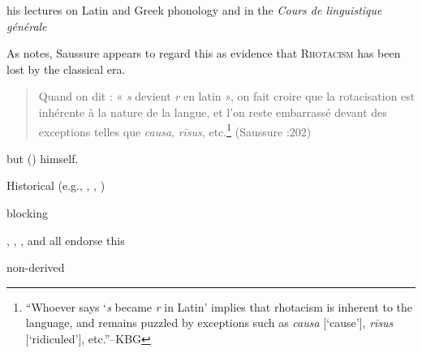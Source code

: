 
\citet{Baldi1994}
\citet[41f.]{Safarewicz1932}

his lectures on Latin and Greek phonology \citep{Reichler-Beguelin1980} and in the \emph{Cours de linguistique générale} \citep{CLG}

As \citet[54]{Anderson1985} notes, Saussure appears to regard this as evidence that \textsc{Rhotacism} has been lost by the classical era.

\begin{quote}
Quand on dit : « \emph{s} devient \emph{r} en latin », on fait croire que
la rotacisation est inhérente à la nature de la langue, et l'on reste
embarrassé devant des exceptions telles que \emph{causa}, \emph{rīsus},
etc.\footnote{
    ``Whoever says `\emph{s} became \emph{r} in Latin' implies
that rhotacism is inherent to the language, and remains puzzled by
exceptions such as \emph{causa} [`cause'], \emph{rīsus} [`ridiculed'],
etc.''--KBG}
(Saussure \citeyear{CLG}:202)
\end{quote}

\citep{KiparskyInPress} but
\citeauthor{KiparskyInPress} (\citeyear{Kiparsky1968,Kiparsky1973a,Kiparsky1982a,Kiparsky1993}) himself.

Historical (e.g., \citealt[\S180]{Leumann1977}, \citealt[\S173]{Sihler1995}, \citealt[\S119]{Sommer1902})

blocking

\citet[42f.]{Cser2010}, \citet[144]{Gruber2006}, \citet[66]{Ito2003}, and \citet[88]{Roberts2012} all endorse this



non-derived

\citet[90]{Blumenfeld2003}
\citet[149]{Gruber2006}
\citet{Roberts2012}
\citet[260f.]{Touratier1971}



